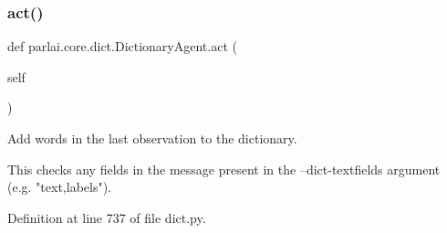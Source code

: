 \mbox{\label{classparlai_1_1core_1_1dict_1_1DictionaryAgent_af34b92857b41748aafdecee34ebf9345}} 
\subsubsection{\texorpdfstring{act()}{act()}}
{\footnotesize\ttfamily def parlai.\+core.\+dict.\+Dictionary\+Agent.\+act (\begin{DoxyParamCaption}\item[{}]{self }\end{DoxyParamCaption})}

\begin{DoxyVerb}Add words in the last observation to the dictionary.

This checks any fields in the message present in the --dict-textfields
argument (e.g. "text,labels").
\end{DoxyVerb}
 

Definition at line 737 of file dict.\+py.



